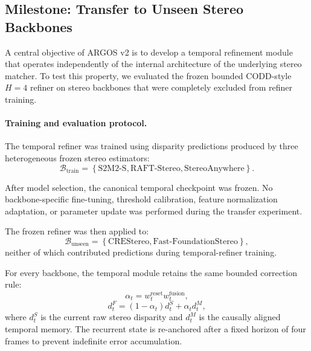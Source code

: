\documentclass[11pt,a4paper]{article}
\begin{document}
\subsection{Milestone: Transfer to Unseen Stereo Backbones}
\label{sec:h4_unseen_backbone_transfer}

A central objective of ARGOS v2 is to develop a temporal refinement module that
operates independently of the internal architecture of the underlying stereo
matcher. To test this property, we evaluated the frozen bounded CODD-style
\(H=4\) refiner on stereo backbones that were completely excluded from refiner
training.

\paragraph{Training and evaluation protocol.}

The temporal refiner was trained using disparity predictions produced by three
heterogeneous frozen stereo estimators:
\begin{equation}
    \mathcal{B}_{\mathrm{train}}
    =
    \left\{
        \text{S2M2-S},
        \text{RAFT-Stereo},
        \text{StereoAnywhere}
    \right\}.
\end{equation}

After model selection, the canonical temporal checkpoint was frozen. No
backbone-specific fine-tuning, threshold calibration, feature normalization
adaptation, or parameter update was performed during the transfer experiment.

The frozen refiner was then applied to:
\begin{equation}
    \mathcal{B}_{\mathrm{unseen}}
    =
    \left\{
        \text{CREStereo},
        \text{Fast-FoundationStereo}
    \right\},
\end{equation}
neither of which contributed predictions during temporal-refiner training.

For every backbone, the temporal module retains the same bounded correction rule:
\begin{equation}
    \alpha_t
    =
    w_t^{\mathrm{reset}}
    w_t^{\mathrm{fusion}},
\end{equation}
\begin{equation}
    d_t^{F}
    =
    \left(1-\alpha_t\right)d_t^{S}
    +
    \alpha_t d_t^{M},
\end{equation}
where \(d_t^{S}\) is the current raw stereo disparity and \(d_t^{M}\) is the
causally aligned temporal memory. The recurrent state is re-anchored after a
fixed horizon of four frames to prevent indefinite error accumulation.
\end{document}
